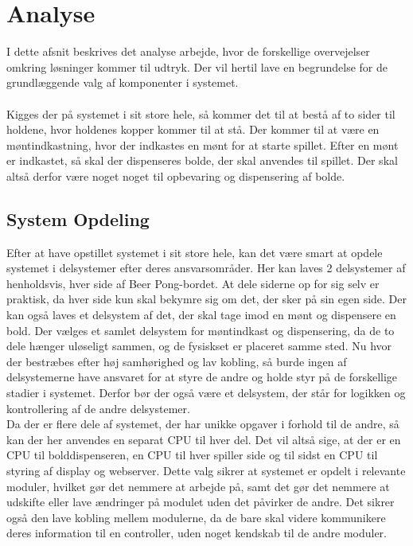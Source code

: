 \documentclass[Rapport/Rapport_main.tex]{subfiles}
\begin{document}
\section{Analyse}\label{sec:Rapport_Analyse}
I dette afsnit beskrives det analyse arbejde, hvor de forskellige overvejelser omkring løsninger kommer til udtryk. Der vil hertil lave en begrundelse for de grundlæggende valg af komponenter i systemet. \\\\
Kigges der på systemet i sit store hele, så kommer det til at bestå af to sider til holdene, hvor holdenes kopper kommer til at stå. Der kommer til at være en møntindkastning, hvor der indkastes en mønt for at starte spillet. Efter en mønt er indkastet, så skal der dispenseres bolde, der skal anvendes til spillet. Der skal altså derfor være noget noget til opbevaring og dispensering af bolde.\\ 
\subsection{System Opdeling}
Efter at have opstillet systemet i sit store hele, kan det være smart at opdele systemet i delsystemer efter deres ansvarsområder. Her kan laves 2 delsystemer af henholdsvis, hver side af Beer Pong-bordet. At dele siderne op for sig selv er praktisk, da hver side kun skal bekymre sig om det, der sker på sin egen side. Der kan også laves et delsystem af det, der skal tage imod en mønt og dispensere en bold. Der vælges et samlet delsystem for møntindkast og dispensering, da de to dele hænger uløseligt sammen, og de fysiskset er placeret samme sted. Nu hvor der bestræbes efter høj samhørighed og lav kobling, så burde ingen af delsystemerne have ansvaret for at styre de andre og holde styr på de forskellige stadier i systemet. Derfor bør der også være et delsystem, der står for logikken og kontrollering af de andre delsystemer.\\
Da der er flere dele af systemet, der har unikke opgaver i forhold til de andre, så kan der her anvendes en separat CPU til hver del. Det vil altså sige, at der er en CPU til bolddispenseren, en CPU til hver spiller side og til sidst en CPU til styring af display og webserver. Dette valg sikrer at systemet er opdelt i relevante moduler, hvilket gør det nemmere at arbejde på, samt det gør det nemmere at udskifte eller lave ændringer på modulet uden det påvirker de andre. Det sikrer også den lave kobling mellem modulerne, da de bare skal videre kommunikere deres information til en controller, uden noget kendskab til de andre moduler.
\end{document}
